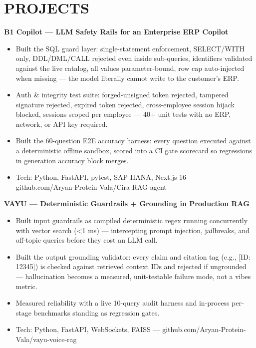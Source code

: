 \documentclass[9pt]{article}
\begin{document}
\section*{PROJECTS}
\textbf{B1 Copilot  ---  LLM Safety Rails for an Enterprise ERP Copilot}
\vspace{1pt}
\begin{itemize}[leftmargin=11pt,itemsep=0pt,topsep=1pt,parsep=0pt]
\item Built the SQL guard layer: single-statement enforcement, SELECT/WITH only, DDL/DML/CALL rejected even inside sub-queries, identifiers validated against the live catalog, all values parameter-bound, row cap auto-injected when missing  ---  the model literally cannot write to the customer's ERP.
\item Auth \& integrity test suite: forged-unsigned token rejected, tampered signature rejected, expired token rejected, cross-employee session hijack blocked, sessions scoped per employee  ---  40+ unit tests with no ERP, network, or API key required.
\item Built the 60-question E2E accuracy harness: every question executed against a deterministic offline sandbox, scored into a CI gate scorecard so regressions in generation accuracy block merges.
\item Tech: Python, FastAPI, pytest, SAP HANA, Next.js 16  ---  github.com/Aryan-Protein-Vala/Cira-RAG-agent
\end{itemize}
\textbf{VĀYU  ---  Deterministic Guardrails + Grounding in Production RAG}
\vspace{1pt}
\begin{itemize}[leftmargin=11pt,itemsep=0pt,topsep=1pt,parsep=0pt]
\item Built input guardrails as compiled deterministic regex running concurrently with vector search (<1 ms)  ---  intercepting prompt injection, jailbreaks, and off-topic queries before they cost an LLM call.
\item Built the output grounding validator: every claim and citation tag (e.g., [ID: 12345]) is checked against retrieved context IDs and rejected if ungrounded  ---  hallucination becomes a measured, unit-testable failure mode, not a vibes metric.
\item Measured reliability with a live 10-query audit harness and in-process per-stage benchmarks standing as regression gates.
\item Tech: Python, FastAPI, WebSockets, FAISS  ---  github.com/Aryan-Protein-Vala/vayu-voice-rag
\end{itemize}
\end{document}
